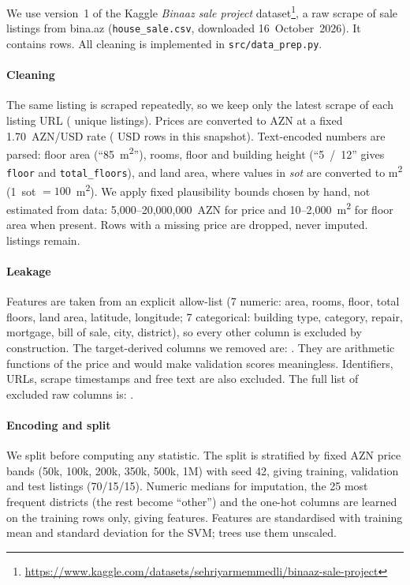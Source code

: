 
We use version~1 of the Kaggle \emph{Binaaz sale project}
dataset\footnote{\url{https://www.kaggle.com/datasets/sehriyarmemmedli/binaaz-sale-project}},
a raw scrape of sale listings from bina.az (\texttt{house\_sale.csv},
downloaded 16~October~2026). It contains \RawRows{} rows. All cleaning is
implemented in \texttt{src/data\_prep.py}.

\paragraph{Cleaning}
The same listing is scraped repeatedly, so we keep only the latest scrape of
each listing URL (\UniqueRows{} unique listings). Prices are converted to AZN
at a fixed 1.70~AZN/USD rate (\UsdRows{} USD rows in this snapshot).
Text-encoded numbers are parsed: floor area (``85~m\textsuperscript{2}''),
rooms, floor and building height (``5~/~12'' gives \texttt{floor} and
\texttt{total\_floors}), and land area, where values in \emph{sot} are
converted to m\textsuperscript{2} (1~sot $=100$~m\textsuperscript{2}). We
apply fixed plausibility bounds chosen by hand, not estimated from data:
5{,}000--20{,}000{,}000~AZN for price and 10--2{,}000~m\textsuperscript{2}
for floor area when present. Rows with a missing price are dropped, never
imputed. \CleanRows{} listings remain.

\paragraph{Leakage}
Features are taken from an explicit allow-list (7 numeric: area, rooms,
floor, total floors, land area, latitude, longitude; 7 categorical:
building type, category, repair, mortgage, bill of sale, city, district),
so every other column is excluded by construction. The target-derived
columns we removed are: \LeakageCols{}. They are arithmetic functions of the
price and would make validation scores meaningless. Identifiers, URLs,
scrape timestamps and free text are also excluded. The full list of
excluded raw columns is: \ExcludedCols{}.

\paragraph{Encoding and split}
We split before computing any statistic. The split is stratified by fixed
AZN price bands (50k, 100k, 200k, 350k, 500k, 1M) with seed 42, giving
\TrainRows{} training, \ValRows{} validation and \TestRows{} test listings
(70/15/15). Numeric medians for imputation, the 25 most frequent districts
(the rest become ``other'') and the one-hot columns are learned on the
training rows only, giving \FeatureCount{} features. Features are
standardised with training mean and standard deviation for the SVM; trees
use them unscaled.

